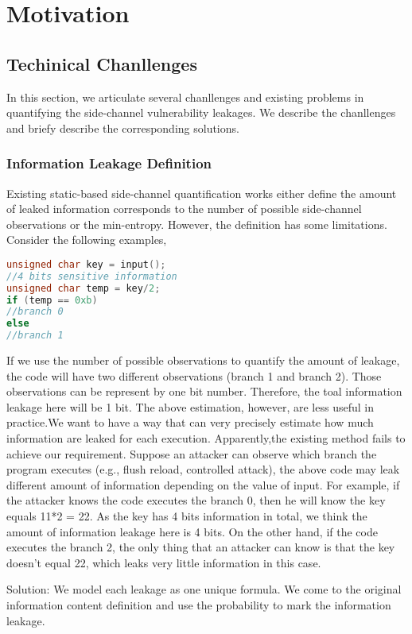 \section{Motivation}
\subsection{Techinical Chanllenges}
In this section, we articulate several chanllenges and existing problems
in quantifying the side-channel vulnerability leakages. We describe the
chanllenges and briefy describe the corresponding solutions.

\subsubsection{Information Leakage Definition}
Existing static-based side-channel quantification works either define the amount of leaked information 
corresponds to the number of possible side-channel observations or the min-entropy. 
However, the definition has some limitations. Consider the following examples,
\begin{lstlisting}[language=C]
unsigned char key = input(); 
//4 bits sensitive information 
unsigned char temp = key/2;
if (temp == 0xb)
//branch 0
else
//branch 1
\end{lstlisting}

If we use the number of possible observations to quantify the amount of leakage, 
the code will have two different observations (branch 1 and branch 2). Those observations
can be represent by one bit number. Therefore, the toal information leakage here will be 1 bit. 
The above estimation, however, are less useful in practice.We want to have a way that can 
very precisely estimate how much information are leaked for each execution. 
Apparently,the existing method fails to achieve our requirement.
Suppose an attacker can observe which branch the program executes (e.g., flush reload, controlled attack), 
the above code may leak different amount of information depending on the value of input.
For example, if the attacker knows the code executes the branch 0, 
then he will know the key equals 11*2 = 22. 
As the key has 4 bits information in total, we think the amount of information leakage here is 4 bits. 
On the other hand, if the code executes the branch 2, 
the only thing that an attacker can know is that the key doesn’t equal 22, 
which leaks very little information in this case.  

Solution: We model each leakage as one unique formula. 
We come to the original information content definition and use the probability to
mark the information leakage.   

